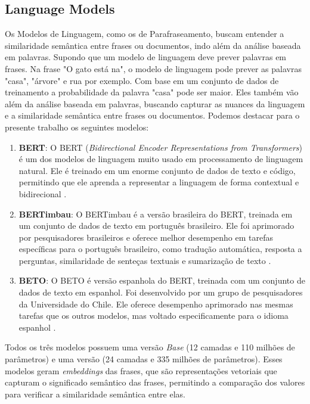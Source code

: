 \subsection{Language Models}
Os Modelos de Linguagem, como os de Parafraseamento, buscam entender a similaridade semântica entre frases ou documentos, indo além da análise baseada em palavras. Supondo que um modelo de linguagem deve prever palavras em frases. Na frase "O gato está na", o modelo de linguagem pode prever as palavras "casa", "árvore" e rua por exemplo. Com base em um conjunto de dados de treinamento a probabilidade da palavra "casa" pode ser maior.
Eles também vão além da análise baseada em palavras, buscando capturar as nuances da linguagem e a similaridade semântica entre frases ou documentos. Podemos destacar para o presente trabalho os seguintes modelos:

\begin{enumerate}
    \item \textbf{BERT}: O BERT (\textit{Bidirectional Encoder Representations from Transformers}) é um dos modelos de linguagem muito usado em processamento de linguagem natural. Ele é treinado em um enorme conjunto de dados de texto e código, permitindo que ele aprenda a representar a linguagem de forma contextual e bidirecional \cite{bert}.
    \item \textbf{BERTimbau}: O BERTimbau é a versão brasileira do BERT, treinada em um conjunto de dados de texto em português brasileiro. Ele foi aprimorado por pesquisadores brasileiros e oferece melhor desempenho em tarefas específicas para o português brasileiro, como tradução automática, resposta a perguntas, similaridade de senteças textuais e sumarização de texto \cite{bertimbau}.
    \item \textbf{BETO}: O BETO é versão espanhola do BERT, treinada com um conjunto de dados de texto em espanhol. Foi desenvolvido por um grupo de pesquisadores da Universidade do Chile. Ele oferece desempenho aprimorado nas mesmas tarefas que os outros modelos, mas voltado especificamente para o idioma espanhol \cite{beto}.
\end{enumerate}

Todos os três modelos possuem uma versão \textit{Base} (12 camadas e 110 milhões de parâmetros) e uma versão  (24 camadas e 335 milhões de parâmetros). Esses modelos geram \textit{embeddings} das frases, que são representações vetoriais que capturam o significado semântico das frases, permitindo a comparação dos valores para verificar a similaridade semântica entre elas.

